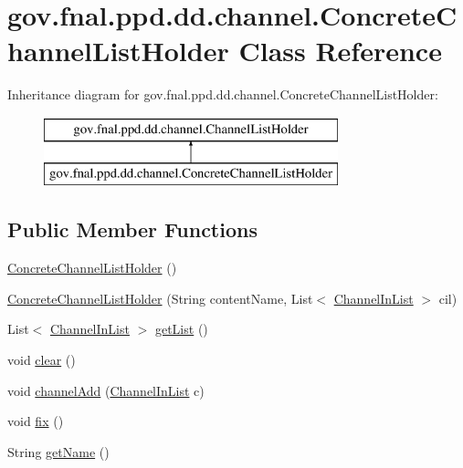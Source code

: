 \hypertarget{classgov_1_1fnal_1_1ppd_1_1dd_1_1channel_1_1ConcreteChannelListHolder}{\section{gov.\-fnal.\-ppd.\-dd.\-channel.\-Concrete\-Channel\-List\-Holder Class Reference}
\label{classgov_1_1fnal_1_1ppd_1_1dd_1_1channel_1_1ConcreteChannelListHolder}
}
Inheritance diagram for gov.\-fnal.\-ppd.\-dd.\-channel.\-Concrete\-Channel\-List\-Holder\-:\begin{figure}[H]
\begin{center}
\leavevmode
\includegraphics[height=2.000000cm]{classgov_1_1fnal_1_1ppd_1_1dd_1_1channel_1_1ConcreteChannelListHolder}
\end{center}
\end{figure}
\subsection*{Public Member Functions}
\begin{DoxyCompactItemize}
\item 
\hyperlink{classgov_1_1fnal_1_1ppd_1_1dd_1_1channel_1_1ConcreteChannelListHolder_ad1ee4768a28585c3b34e82263564978c}{Concrete\-Channel\-List\-Holder} ()
\item 
\hyperlink{classgov_1_1fnal_1_1ppd_1_1dd_1_1channel_1_1ConcreteChannelListHolder_a0389837f42923bf4457066031e536f4e}{Concrete\-Channel\-List\-Holder} (String content\-Name, List$<$ \hyperlink{interfacegov_1_1fnal_1_1ppd_1_1dd_1_1channel_1_1ChannelInList}{Channel\-In\-List} $>$ cil)
\item 
List$<$ \hyperlink{interfacegov_1_1fnal_1_1ppd_1_1dd_1_1channel_1_1ChannelInList}{Channel\-In\-List} $>$ \hyperlink{classgov_1_1fnal_1_1ppd_1_1dd_1_1channel_1_1ConcreteChannelListHolder_affa1b398ed9fc7dbad18215765653e14}{get\-List} ()
\item 
void \hyperlink{classgov_1_1fnal_1_1ppd_1_1dd_1_1channel_1_1ConcreteChannelListHolder_aef1741e4b499729c50dce421c87938b8}{clear} ()
\item 
void \hyperlink{classgov_1_1fnal_1_1ppd_1_1dd_1_1channel_1_1ConcreteChannelListHolder_ad56aa51994e24f71e2ae6879de6d0bb7}{channel\-Add} (\hyperlink{interfacegov_1_1fnal_1_1ppd_1_1dd_1_1channel_1_1ChannelInList}{Channel\-In\-List} c)
\item 
void \hyperlink{classgov_1_1fnal_1_1ppd_1_1dd_1_1channel_1_1ConcreteChannelListHolder_aa560e7478cd1776380d9ff8e131c65c7}{fix} ()
\item 
String \hyperlink{classgov_1_1fnal_1_1ppd_1_1dd_1_1channel_1_1ConcreteChannelListHolder_a54e97b13a69c73cb973a184fa67c7175}{get\-Name} ()
\end{DoxyCompactItemize}


